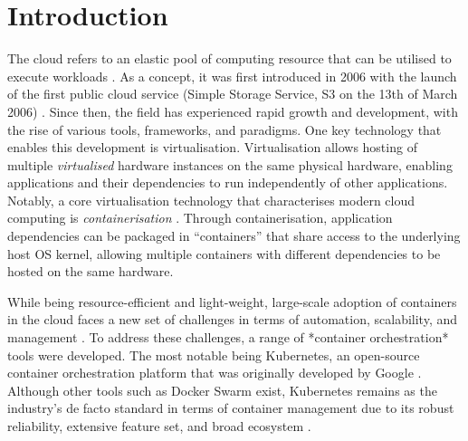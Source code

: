 
\newpage

\tableofcontents


\newpage


\chapter{Introduction}

The cloud refers to an elastic pool of computing resource that can be utilised to execute workloads \cite{editorCloudComputingGlossary}. As a concept, it was first introduced in 2006 with the launch of the first public cloud service (Simple Storage Service, S3 on the 13th of March 2006) \cite{liuReviewDigitalTwin2021}. Since then, the field has experienced rapid growth and development, with the rise of various tools, frameworks, and paradigms. One key technology that enables this development is virtualisation. Virtualisation allows hosting of multiple \textit{virtualised} hardware instances on the same physical hardware, enabling applications and their dependencies to run independently of other applications. Notably, a core virtualisation technology that characterises modern cloud computing is \textit{containerisation} \cite{pereiraferreiraPerformanceEvaluationContainers2019}. Through containerisation, application dependencies can be packaged in “containers” that share access to the underlying host OS kernel, allowing multiple containers with different dependencies to be hosted on the same hardware.


While being resource-efficient and light-weight, large-scale adoption of containers in the cloud faces a new set of challenges in terms of automation, scalability, and management \cite{pereiraferreiraPerformanceEvaluationContainers2019,felterUpdatedPerformanceComparison2015}. To address these challenges, a range of *container orchestration* tools were developed. The most notable being Kubernetes, an open-source container orchestration platform that was originally developed by Google \cite{Kubernetes, pereiraferreiraPerformanceEvaluationContainers2019}. Although other tools such as Docker Swarm exist, Kubernetes remains as the industry’s de facto standard in terms of container management due to its robust reliability, extensive feature set, and broad ecosystem \cite{truyenComprehensiveFeatureComparison2019,KubernetesKubernetesProductionGrade,SwarmMode0200}.

